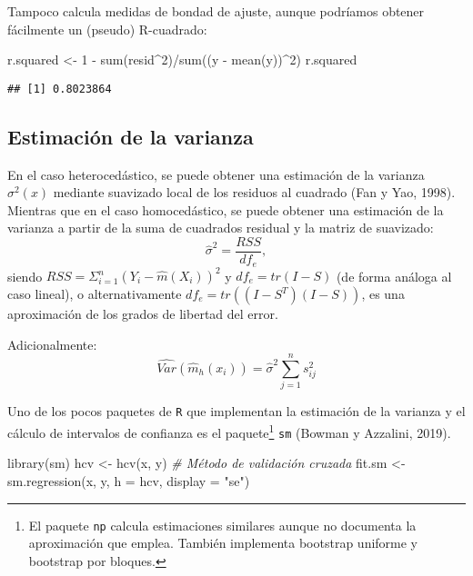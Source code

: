 \documentclass[
]{book}
\newenvironment{Shaded}{\begin{snugshade}}{\end{snugshade}}
\newcommand{\AttributeTok}[1]{\textcolor[rgb]{0.77,0.63,0.00}{#1}}
\newcommand{\CommentTok}[1]{\textcolor[rgb]{0.56,0.35,0.01}{\textit{#1}}}
\newcommand{\DecValTok}[1]{\textcolor[rgb]{0.00,0.00,0.81}{#1}}
\newcommand{\FunctionTok}[1]{\textcolor[rgb]{0.00,0.00,0.00}{#1}}
\newcommand{\NormalTok}[1]{#1}
\newcommand{\OtherTok}[1]{\textcolor[rgb]{0.56,0.35,0.01}{#1}}
\newcommand{\SpecialCharTok}[1]{\textcolor[rgb]{0.00,0.00,0.00}{#1}}
\newcommand{\StringTok}[1]{\textcolor[rgb]{0.31,0.60,0.02}{#1}}
\theoremstyle{break}
\theoremstyle{definition}
\theoremstyle{definition}
\theoremstyle{definition}
\theoremstyle{definition}
\theoremstyle{remark}
\begin{document}
Tampoco calcula medidas de bondad de ajuste, aunque podríamos obtener fácilmente un (pseudo) R-cuadrado:

\begin{Shaded}
\begin{Highlighting}[]
\NormalTok{r.squared }\OtherTok{\textless{}{-}} \DecValTok{1} \SpecialCharTok{{-}} \FunctionTok{sum}\NormalTok{(resid}\SpecialCharTok{\^{}}\DecValTok{2}\NormalTok{)}\SpecialCharTok{/}\FunctionTok{sum}\NormalTok{((y }\SpecialCharTok{{-}} \FunctionTok{mean}\NormalTok{(y))}\SpecialCharTok{\^{}}\DecValTok{2}\NormalTok{)}
\NormalTok{r.squared}
\end{Highlighting}
\end{Shaded}

\begin{verbatim}
## [1] 0.8023864
\end{verbatim}

\hypertarget{estimaciuxf3n-de-la-varianza}{%
\subsection{Estimación de la varianza}\label{estimaciuxf3n-de-la-varianza}}

En el caso heterocedástico, se puede obtener una estimación de la varianza
\(\sigma^2(x)\) mediante suavizado local de los residuos al cuadrado
(Fan y Yao, 1998). Mientras que en el caso homocedástico, se puede obtener
una estimación de la varianza a partir de la suma de cuadrados residual y la
matriz de suavizado:
\[\hat\sigma^2 = \frac{RSS}{df_e},\]
siendo \(RSS=\Sigma_{i=1}^n \left( Y_i - \hat m(X_i) \right)^2\)
y \(df_e = tr(I - S)\) (de forma análoga al caso lineal), o alternativamente \(df_e = tr \left( (I - S^{T})(I - S)\right)\), es una aproximación de los grados de libertad del error.

Adicionalmente:
\[\widehat{Var}\left(\hat{m}_{h}(x_i)\right) = \hat\sigma^2\sum_{j=1}^n s^2_{ij}\]

Uno de los pocos paquetes de \texttt{R} que implementan la estimación de la varianza
y el cálculo de intervalos de confianza es el paquete\footnote{El paquete \texttt{np} calcula
  estimaciones similares aunque no documenta la aproximación que emplea. También
  implementa bootstrap uniforme y bootstrap por bloques.} \texttt{sm} (Bowman y Azzalini, 2019).

\begin{Shaded}
\begin{Highlighting}[]
\FunctionTok{library}\NormalTok{(sm)}
\NormalTok{hcv }\OtherTok{\textless{}{-}} \FunctionTok{hcv}\NormalTok{(x, y) }\CommentTok{\# Método de validación cruzada}
\NormalTok{fit.sm }\OtherTok{\textless{}{-}} \FunctionTok{sm.regression}\NormalTok{(x, y, }\AttributeTok{h =}\NormalTok{ hcv, }\AttributeTok{display =} \StringTok{"se"}\NormalTok{)}
\end{Highlighting}
\end{Shaded}
\end{document}

